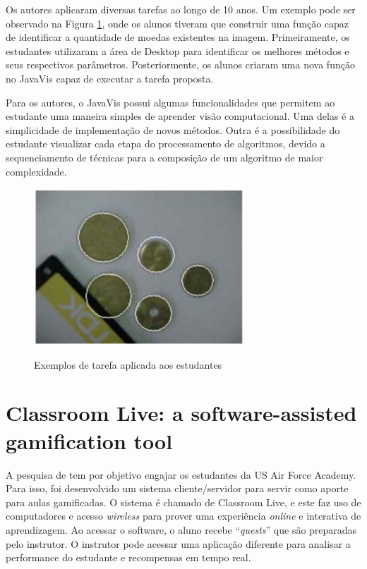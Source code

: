 \documentclass[
	12pt,				%
	oneside,			%
	a4paper,			%
	english,			%
	french,				%
	spanish,			%
	brazil,				%
	]{abntex2}
\begin{document}
Os autores aplicaram diversas tarefas ao longo de 10 anos. Um exemplo pode ser observado na Figura \ref{fig:javavis_avaliacao}, onde os alunos tiveram que construir uma função capaz de identificar a quantidade de moedas existentes na imagem. Primeiramente, os estudantes utilizaram a área de Desktop para identificar os melhores métodos e seus respectivos parâmetros. Posteriormente, os alunos criaram uma nova função no JavaVis capaz de executar a tarefa proposta.

Para os autores, o JavaVis possui algumas funcionalidades que permitem ao estudante uma maneira simples de aprender visão computacional. Uma delas é a simplicidade de implementação de novos métodos. Outra é a possibilidade do estudante visualizar cada etapa do processamento de algoritmos, devido a sequenciamento de técnicas para a composição de um algoritmo de maior complexidade.

\begin{figure}[ht]
\centering
\caption{Exemplos de tarefa aplicada aos estudantes}
\includegraphics[width=0.7\textwidth]{imagens/javavis_avaliacao.png}
\label{fig:javavis_avaliacao}
\end{figure}

\section{Classroom Live: a software-assisted gamification tool}
\label{sec:classrom}

A pesquisa de \citet{de2013classroom} tem por objetivo engajar os estudantes da US Air Force Academy. Para isso, foi desenvolvido um sistema cliente/servidor para servir como aporte para aulas gamificadas. O sistema é chamado de Classroom Live, e este faz uso de computadores e acesso \textit{wireless} para prover uma experiência \textit{online} e interativa de aprendizagem. Ao acessar o software, o aluno recebe “\textit{quests}” que são preparadas pelo instrutor. O instrutor pode acessar uma aplicação diferente para analisar a performance do estudante e recompensas em tempo real.
\end{document}
